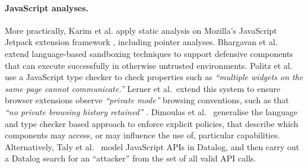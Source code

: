 \paragraph{JavaScript analyses.}
More practically, 
Karim et al. apply static analysis on
Mozilla's JavaScript Jetpack extension framework \cite{adsafe}, including
 pointer analyses. %
Bhargavan et al.\ \cite{DefJS}
extend language-based sandboxing techniques to support defensive
components that can execute successfully  in otherwise untrusted
environments.   Politz et
al.\ \cite{ADsafety} use a JavaScript type checker to check
properties such as
 \textit{``multiple widgets on the same page
  cannot communicate.''}
Lerner et al.\ extend this system to ensure browser
extensions observe \textit{``private mode''} browsing conventions,
such as that \textit{``no private browsing history retained''}
\cite{Lerner2013b}.  Dimoulas et al.\ \cite{DPCC14} generalise the
language and type checker based approach to enforce explicit policies,
that  describe  which components  may
access, or may influence the use of, particular capabilities.
Alternatively, Taly et al.\ \cite{secureJS}
model  JavaScript APIs in Datalog, and then
carry out a Datalog search for an ``attacker'' from the set of all
valid API calls. 


